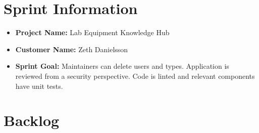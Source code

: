 \section*{Sprint Information}

\begin{itemize}[noitemsep]
    \item \textbf{Project Name:} Lab Equipment Knowledge Hub
    \item \textbf{Customer Name:} Zeth Danielsson
    \item \textbf{Sprint Goal:} Maintainers can delete users and types. Application is reviewed from a security perspective. Code is linted and relevant components have unit tests.
\end{itemize}

\section*{Backlog}
